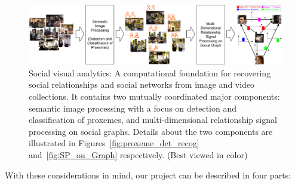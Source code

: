 \begin{figure}[t!]
\begin{center}
\includegraphics[width=\columnwidth]{overview}
\end{center}
\vspace{-0.25in} \caption{\captionsize 
Social visual analytics: A computational foundation for recovering social relationships and social networks from image and video collections. It contains two mutually coordinated major components: semantic image processing with a focus on detection and classification of proxemes, and multi-dimensional relationship signal processing on social graphs.  Details about the two components are illustrated in Figures~\ref{fig:proxeme_det_recog} and~\ref{fig:SP_on_Graph} respectively. (Best viewed in color)\label{fig:intro}\afterfigspace}
\end{figure}


With these considerations in mind, our project can be described in four parts:


